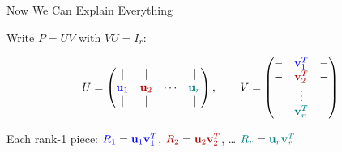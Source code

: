 \documentclass[10pt]{beamer}
\theoremstyle{definition}
\newcommand{\bl}[1]{{\color{blue}#1}}                 %
\newcommand{\rd}[1]{{\color{red!70!black}#1}}         %
\newcommand{\tl}[1]{{\color{teal}#1}}                 %
\begin{document}
\begin{frame}{Now We Can Explain Everything}

Write $P = UV$ with $VU = I_r$:

$$U = \begin{pmatrix} | & | & & | \\ \bl{\mathbf{u}_1} & \rd{\mathbf{u}_2} & \cdots & \tl{\mathbf{u}_r} \\ | & | & & | \end{pmatrix}, \qquad V = \begin{pmatrix} - & \bl{\mathbf{v}_1^T} & - \\ - & \rd{\mathbf{v}_2^T} & - \\ & \vdots & \\ - & \tl{\mathbf{v}_r^T} & - \end{pmatrix}$$

Each rank-1 piece: $\bl{R_1} = \bl{\mathbf{u}_1} \bl{\mathbf{v}_1^T}$, \; $\rd{R_2} = \rd{\mathbf{u}_2} \rd{\mathbf{v}_2^T}$, \; \ldots \; $\tl{R_r} = \tl{\mathbf{u}_r} \tl{\mathbf{v}_r^T}$

\end{frame}
\end{document}
